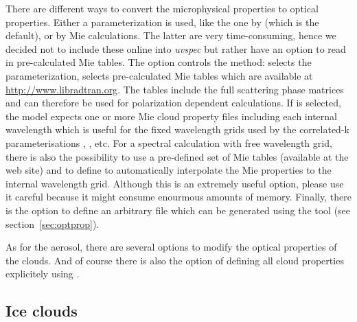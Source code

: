 There are different ways to convert the microphysical properties to
optical properties. Either a parameterization is used, like the one by
\citet{Hu1993} (which is the default), or by Mie
calculations. The latter are very time-consuming, hence we decided not
to include these online into {\sl uvspec} but rather have an option
to read in pre-calculated Mie tables. The option 
controls the method:  selects the \citet{Hu1993}
parameterization,  selects pre-calculated Mie tables which
are available at \url{http://www.libradtran.org}. The tables include
the full scattering phase matrices and can therefore be used for
polarization dependent calculations. If  is selected, the model expects one or more Mie cloud property
files including each internal wavelength which is useful for the fixed wavelength
grids used by the correlated-k parameterisations , , etc. For a spectral calculation with
free wavelength grid, there is also the possibility to use a
pre-defined set of Mie tables (available at the web site) and to
define  to automatically
interpolate the Mie properties to the internal wavelength
grid. Although this is an extremely useful option, please use it
careful because it might consume enourmous amounts of memory. Finally,
there is the option to define an arbitrary file which can be generated
using the  tool (see section~\ref{sec:optprop}).

As for the aerosol, there are several options to modify the optical
properties of the clouds. And of course there is also the option of
defining all cloud properties explicitely using .

\subsection{Ice clouds \label{seq:ice_clouds}}

